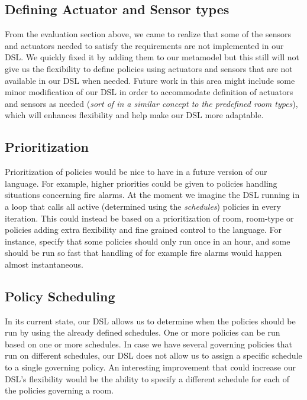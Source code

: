 \subsection{Defining Actuator and Sensor types}\label{subsec:def-sensor-actuator-types}
From the evaluation section above, we came to realize that some of the sensors and actuators needed to satisfy the requirements are not implemented in our DSL. We quickly fixed it by adding them to our metamodel but this still will not give us the flexibility to define policies using actuators and sensors that are not available in our DSL when needed. Future work in this area might include some minor modification of our DSL in order to accommodate definition of actuators and sensors as needed (\textit{sort of in a similar concept to the predefined room types}), which will enhances flexibility and help make our DSL more adaptable.

\subsection{Prioritization}\label{subsec:looptime}
Prioritization of policies would be nice to have in a future version of our language. For example, higher priorities could be given to policies handling situations concerning fire alarms. At the moment we imagine the DSL running in a loop that calls all active (determined using the \textit{schedules}) policies in every iteration. This could instead be based on a prioritization of room, room-type or policies adding extra flexibility and fine grained control to the language. For instance, specify that some policies should only run once in an hour, and some should be run so fast that handling of for example fire alarms would happen almost instantaneous. 

\subsection{Policy Scheduling}\label{subsec:during}
In its current state, our DSL allows us to determine when the policies should be run by using the already defined schedules. One or more policies can be run based on one or more schedules. 
In case we have several governing policies that run on different schedules, our DSL does not allow us to assign a specific schedule to a single governing policy. An interesting improvement that could increase our DSL's flexibility would be the ability to specify a different schedule for each of the policies governing a room.